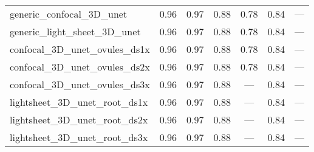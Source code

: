 \documentclass[./dissertation.tex]{subfiles}
\begin{document}
\begin{table}
\begin{tabular}{|l|c|c|c|c|c|c|}
        generic\_confocal\_3D\_unet               & 0.96                                    & 0.97                                        & 0.88                                    & 0.78                                  & 0.84                                   & ---                                     \\
        generic\_light\_sheet\_3D\_unet           & 0.96                                    & 0.97                                        & 0.88                                    & 0.78                                  & 0.84                                   & ---                                     \\
        confocal\_3D\_unet\_ovules\_ds1x          & 0.96                                    & 0.97                                        & 0.88                                    & 0.78                                  & 0.84                                   & ---                                     \\
        confocal\_3D\_unet\_ovules\_ds2x          & 0.96                                    & 0.97                                        & 0.88                                    & 0.78                                  & 0.84                                   & ---                                     \\
        confocal\_3D\_unet\_ovules\_ds3x          & 0.96                                    & 0.97                                        & 0.88                                    & ---                                   & 0.84                                   & ---                                     \\
        lightsheet\_3D\_unet\_root\_ds1x          & 0.96                                    & 0.97                                        & 0.88                                    & ---                                   & 0.84                                   & ---                                     \\
        lightsheet\_3D\_unet\_root\_ds2x          & 0.96                                    & 0.97                                        & 0.88                                    & ---                                   & 0.84                                   & ---                                     \\
        lightsheet\_3D\_unet\_root\_ds3x          & 0.96                                    & 0.97                                        & 0.88                                    & ---                                   & 0.84                                   & ---                                     \\

\end{tabular}
\end{table}
\end{document}
